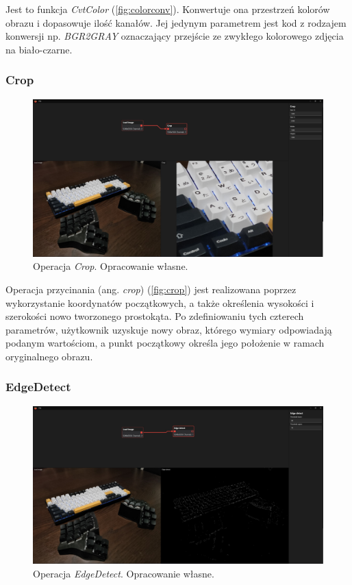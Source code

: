 Jest to funkcja \textit{CvtColor} \cite{cvtcol} (\autoref{fig:colorconv}). Konwertuje ona przestrzeń kolorów obrazu i dopasowuje ilość kanałów.
Jej jedynym parametrem jest kod z rodzajem konwersji np. \textit{BGR2GRAY} oznaczający przejście ze zwykłego kolorowego zdjęcia na biało-czarne.

\subsubsection{Crop}

\begin{figure}[H]
    \centering
    \includegraphics[width=1\linewidth]{images/Picture24.jpg}
    \caption{Operacja \textit{Crop}. Opracowanie własne.}
    \label{fig:crop}
\end{figure}

Operacja przycinania (ang. \textit{crop}) (\autoref{fig:crop}) jest realizowana poprzez wykorzystanie koordynatów początkowych, a także określenia wysokości i szerokości nowo tworzonego prostokąta. Po zdefiniowaniu tych czterech parametrów, użytkownik uzyskuje nowy obraz, którego wymiary odpowiadają podanym wartościom, a punkt początkowy określa jego położenie w ramach oryginalnego obrazu.

\subsubsection{EdgeDetect}

\begin{figure}[H]
    \centering
    \includegraphics[width=1\linewidth]{images/Picture25.jpg}
    \caption{Operacja \textit{EdgeDetect}. Opracowanie własne.}
    \label{fig:edgeDetect}
\end{figure}  

